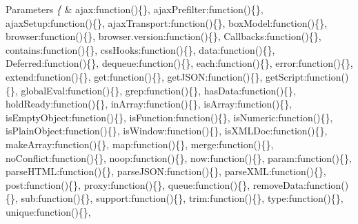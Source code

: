 \begin{DoxyParams}{Parameters}
{\em \{} & \textquotesingle{}ajax\textquotesingle{}\+:function()\{\}, \textquotesingle{}ajax\+Prefilter\textquotesingle{}\+:function()\{\}, \textquotesingle{}ajax\+Setup\textquotesingle{}\+:function()\{\}, \textquotesingle{}ajax\+Transport\textquotesingle{}\+:function()\{\}, \textquotesingle{}box\+Model\textquotesingle{}\+:function()\{\}, \textquotesingle{}browser\textquotesingle{}\+:function()\{\}, \textquotesingle{}browser.\+version\textquotesingle{}\+:function()\{\}, \textquotesingle{}Callbacks\textquotesingle{}\+:function()\{\}, \textquotesingle{}contains\textquotesingle{}\+:function()\{\}, \textquotesingle{}css\+Hooks\textquotesingle{}\+:function()\{\}, \textquotesingle{}data\textquotesingle{}\+:function()\{\}, \textquotesingle{}Deferred\textquotesingle{}\+:function()\{\}, \textquotesingle{}dequeue\textquotesingle{}\+:function()\{\}, \textquotesingle{}each\textquotesingle{}\+:function()\{\}, \textquotesingle{}error\textquotesingle{}\+:function()\{\}, \textquotesingle{}extend\textquotesingle{}\+:function()\{\}, \textquotesingle{}get\textquotesingle{}\+:function()\{\}, \textquotesingle{}get\+J\+S\+O\+N\textquotesingle{}\+:function()\{\}, \textquotesingle{}get\+Script\textquotesingle{}\+:function()\{\}, \textquotesingle{}global\+Eval\textquotesingle{}\+:function()\{\}, \textquotesingle{}grep\textquotesingle{}\+:function()\{\}, \textquotesingle{}has\+Data\textquotesingle{}\+:function()\{\}, \textquotesingle{}hold\+Ready\textquotesingle{}\+:function()\{\}, \textquotesingle{}in\+Array\textquotesingle{}\+:function()\{\}, \textquotesingle{}is\+Array\textquotesingle{}\+:function()\{\}, \textquotesingle{}is\+Empty\+Object\textquotesingle{}\+:function()\{\}, \textquotesingle{}is\+Function\textquotesingle{}\+:function()\{\}, \textquotesingle{}is\+Numeric\textquotesingle{}\+:function()\{\}, \textquotesingle{}is\+Plain\+Object\textquotesingle{}\+:function()\{\}, \textquotesingle{}is\+Window\textquotesingle{}\+:function()\{\}, \textquotesingle{}is\+X\+M\+L\+Doc\textquotesingle{}\+:function()\{\}, \textquotesingle{}make\+Array\textquotesingle{}\+:function()\{\}, \textquotesingle{}map\textquotesingle{}\+:function()\{\}, \textquotesingle{}merge\textquotesingle{}\+:function()\{\}, \textquotesingle{}no\+Conflict\textquotesingle{}\+:function()\{\}, \textquotesingle{}noop\textquotesingle{}\+:function()\{\}, \textquotesingle{}now\textquotesingle{}\+:function()\{\}, \textquotesingle{}param\textquotesingle{}\+:function()\{\}, \textquotesingle{}parse\+H\+T\+M\+L\textquotesingle{}\+:function()\{\}, \textquotesingle{}parse\+J\+S\+O\+N\textquotesingle{}\+:function()\{\}, \textquotesingle{}parse\+X\+M\+L\textquotesingle{}\+:function()\{\}, \textquotesingle{}post\textquotesingle{}\+:function()\{\}, \textquotesingle{}proxy\textquotesingle{}\+:function()\{\}, \textquotesingle{}queue\textquotesingle{}\+:function()\{\}, \textquotesingle{}remove\+Data\textquotesingle{}\+:function()\{\}, \textquotesingle{}sub\textquotesingle{}\+:function()\{\}, \textquotesingle{}support\textquotesingle{}\+:function()\{\}, \textquotesingle{}trim\textquotesingle{}\+:function()\{\}, \textquotesingle{}type\textquotesingle{}\+:function()\{\}, \textquotesingle{}unique\textquotesingle{}\+:function()\{\}, 
\end{DoxyParams}
